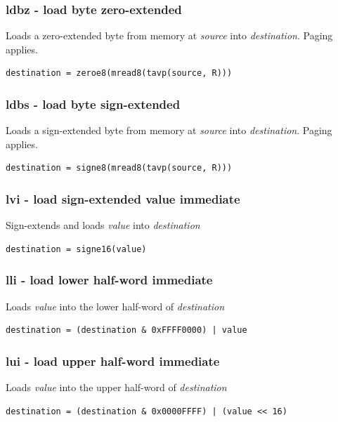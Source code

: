 \documentclass[a4paper,10pt]{article}
\begin{document}
\subsubsection{ldbz - load byte zero-extended}
	{Loads a zero-extended byte from memory at \emph{source} into \emph{destination}}. Paging applies.
\begin{lstlisting}
destination = zeroe8(mread8(tavp(source, R)))
\end{lstlisting}

\subsubsection{ldbs - load byte sign-extended}
	{Loads a sign-extended byte from memory at \emph{source} into \emph{destination}}. Paging applies.
\begin{lstlisting}
destination = signe8(mread8(tavp(source, R)))
\end{lstlisting}

\subsubsection{lvi - load sign-extended value immediate}
	{Sign-extends and loads \emph{value} into \emph{destination}}
\begin{lstlisting}
destination = signe16(value)
\end{lstlisting}

\subsubsection{lli - load lower half-word immediate}
	{Loads \emph{value} into the lower half-word of \emph{destination}}
\begin{lstlisting}
destination = (destination & 0xFFFF0000) | value
\end{lstlisting}

\subsubsection{lui - load upper half-word immediate}
	{Loads \emph{value} into the upper half-word of \emph{destination}}
\begin{lstlisting}
destination = (destination & 0x0000FFFF) | (value << 16)
\end{lstlisting}
\end{document}
